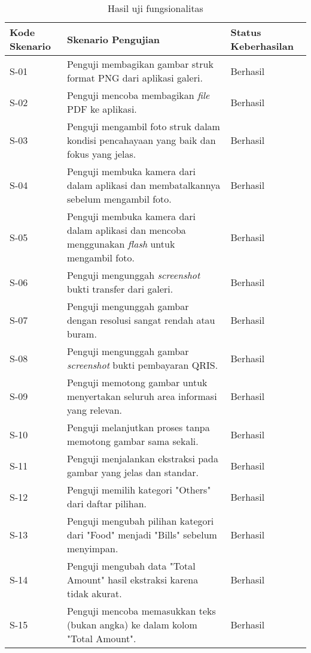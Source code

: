 \begin{table}[h!]
\caption{Hasil uji fungsionalitas}
\label{tab:hasil-uji-fungsionalitas}
\begin{tabularx}{\linewidth}{|p{2cm}|X|p{2.5cm}|}
\hline
\textbf{Kode Skenario} & \textbf{Skenario Pengujian} & \textbf{Status Keberhasilan} \\
\hline
S-01 & Penguji membagikan gambar struk format PNG dari aplikasi galeri. & Berhasil \\
\hline
S-02 & Penguji mencoba membagikan \emph{file} PDF ke aplikasi. & Berhasil \\
\hline
S-03 & Penguji mengambil foto struk dalam kondisi pencahayaan yang baik dan fokus yang jelas. & Berhasil \\
\hline
S-04 & Penguji membuka kamera dari dalam aplikasi dan membatalkannya sebelum mengambil foto. & Berhasil \\
\hline
S-05 & Penguji membuka kamera dari dalam aplikasi dan mencoba menggunakan \emph{flash} untuk mengambil foto. & Berhasil \\
\hline
S-06 & Penguji mengunggah \emph{screenshot} bukti transfer dari galeri. & Berhasil \\
\hline
S-07 & Penguji mengunggah gambar dengan resolusi sangat rendah atau buram. & Berhasil \\
\hline
S-08 & Penguji mengunggah gambar \emph{screenshot} bukti pembayaran QRIS. & Berhasil \\
\hline
S-09 & Penguji memotong gambar untuk menyertakan seluruh area informasi yang relevan. & Berhasil \\
\hline
S-10 & Penguji melanjutkan proses tanpa memotong gambar sama sekali. & Berhasil \\
\hline
S-11 & Penguji menjalankan ekstraksi pada gambar yang jelas dan standar. & Berhasil \\
\hline
S-12 & Penguji memilih kategori "Others" dari daftar pilihan. & Berhasil \\
\hline
S-13 & Penguji mengubah pilihan kategori dari "Food" menjadi "Bills" sebelum menyimpan. & Berhasil \\
\hline
S-14 & Penguji mengubah data "Total Amount" hasil ekstraksi karena tidak akurat. & Berhasil \\
\hline
S-15 & Penguji mencoba memasukkan teks (bukan angka) ke dalam kolom "Total Amount". & Berhasil \\
\hline
\end{tabularx}
\end{table}

